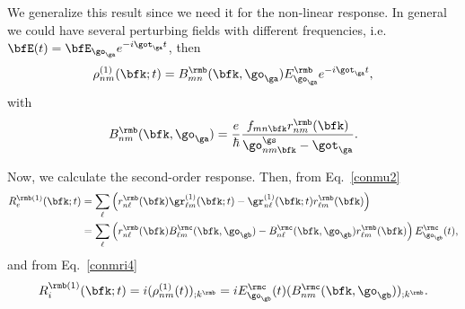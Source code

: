 \documentclass[floatfix,prb,aps,superscriptaddress,11pt,preprint,letterpaper]{revtex4}
\begin{document}
We generalize this result since we need it for the non-linear response.
In general we could have several perturbing fields with different
frequencies,
i.e. $\bfE(t)=\bfE_{\go_\ga} e^{-i\got_\ga t}$, then
\begin{equation}\label{rhonoi1}
\rho^{(1)}_{nm}(\bfk;t)=B^{\rmb}_{mn}(\bfk,\go_\ga)E_{\go_\ga}^{\rmb}e^{-i\got_\ga t}
,
\end{equation}
with
\begin{equation}\label{rho1} 
B^{\rmb}_{nm}(\bfk,\go_\ga)=\frac{e}{\hbar}\frac{f_{mn\bfk}r^{\rmb}_{nm}(\bfk)}{\go^\gs_{nm\bfk}-\got_\ga}
.
\end{equation} 

Now, we calculate the second-order response. Then, from Eq.~\eqref{conmu2}
\begin{align}\label{R1e}
R_e^{\rmb(1)}(\bfk;t)
&=
\sum_{\ell}
\left(
r^{\rmb}_{n\ell}(\bfk)
\gr^{(1)}_{\ell m}(\bfk;t)
-
\gr^{(1)}_{n\ell}(\bfk;t)
r^{\rmb}_{\ell m}(\bfk)
\right)
\nonumber \\
&=
\sum_{\ell}
\left(
r^{\rmb}_{n\ell}(\bfk)
B^{\rmc}_{\ell m}(\bfk,\go_\gb)
-
B^{\rmc}_{n\ell}(\bfk,\go_\gb)
r^{\rmb}_{\ell m}(\bfk)
\right)E_{\go_\gb}^{\rmc}(t)
,
\end{align}
and from Eq.~\eqref{conmri4}
\begin{equation}\label{R1i}
R_i^{\rmb(1)}(\bfk;t)=i(\rho^{(1)}_{nm}(t))_{;k^{\rmb}}=iE_{\go_\gb}^{\rmc}(t)(B^{\rmc}_{nm}(\bfk,\go_\gb))_{;k^{\rmb}}
.
\end{equation}
\end{document}
